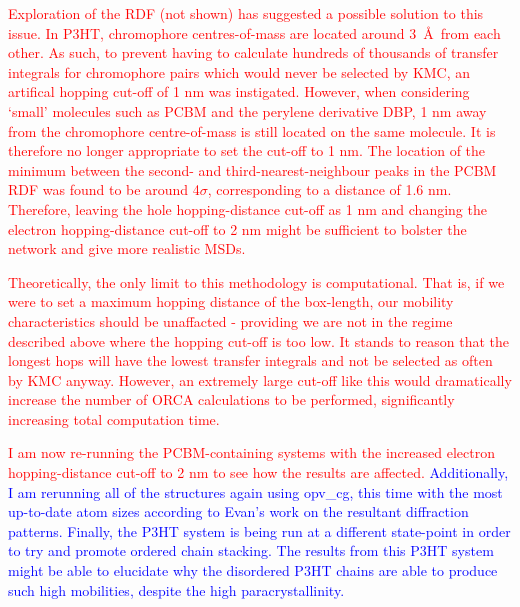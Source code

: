 \documentclass[12pt]{article}
\begin{document}
\textcolor{red}{Exploration of the RDF (not shown) has suggested a possible solution to this issue.
In P3HT, chromophore centres-of-mass are located around 3~\AA~from each other.
As such, to prevent having to calculate hundreds of thousands of transfer integrals for chromophore pairs which would never be selected by KMC, an artifical hopping cut-off of 1 nm was instigated.
However, when considering `small' molecules such as PCBM and the perylene derivative DBP, 1 nm away from the chromophore centre-of-mass is still located on the same molecule.
It is therefore no longer appropriate to set the cut-off to 1 nm.
The location of the minimum between the second- and third-nearest-neighbour peaks in the PCBM RDF was found to be around 4$\sigma$, corresponding to a distance of 1.6 nm.
Therefore, leaving the hole hopping-distance cut-off as 1 nm and changing the electron hopping-distance cut-off to 2 nm might be sufficient to bolster the network and give more realistic MSDs.}

\textcolor{red}{Theoretically, the only limit to this methodology is computational.
    That is, if we were to set a maximum hopping distance of the box-length, our mobility characteristics should be unaffacted - providing we are not in the regime described above where the hopping cut-off is too low.
    It stands to reason that the longest hops will have the lowest transfer integrals and not be selected as often by KMC anyway.
However, an extremely large cut-off like this would dramatically increase the number of ORCA calculations to be performed, significantly increasing total computation time.
}

\textcolor{red}{I am now re-running the PCBM-containing systems with the increased electron hopping-distance cut-off to 2 nm to see how the results are affected.}
\textcolor{blue}{Additionally, I am rerunning all of the structures again using opv\_cg, this time with the most up-to-date atom sizes according to Evan's work on the resultant diffraction patterns.
    Finally, the P3HT system is being run at a different state-point in order to try and promote ordered chain stacking.
The results from this P3HT system might be able to elucidate why the disordered P3HT chains are able to produce such high mobilities, despite the high paracrystallinity.}






\end{document}
